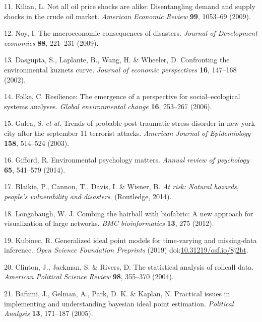 \documentclass[
]{article}
\newenvironment{cslreferences}%
  {}%
  {\par}
\begin{document}
\begin{cslreferences}
\leavevmode\hypertarget{ref-kilian2009not}{}%
11. Kilian, L. Not all oil price shocks are alike: Disentangling demand and supply shocks in the crude oil market. \emph{American Economic Review} \textbf{99}, 1053--69 (2009).

\leavevmode\hypertarget{ref-noy2009macroeconomic}{}%
12. Noy, I. The macroeconomic consequences of disasters. \emph{Journal of Development economics} \textbf{88}, 221--231 (2009).

\leavevmode\hypertarget{ref-dasgupta2002confronting}{}%
13. Dasgupta, S., Laplante, B., Wang, H. \& Wheeler, D. Confronting the environmental kuznets curve. \emph{Journal of economic perspectives} \textbf{16}, 147--168 (2002).

\leavevmode\hypertarget{ref-folke2006resilience}{}%
14. Folke, C. Resilience: The emergence of a perspective for social--ecological systems analyses. \emph{Global environmental change} \textbf{16}, 253--267 (2006).

\leavevmode\hypertarget{ref-galea2003trends}{}%
15. Galea, S. \emph{et al.} Trends of probable post-traumatic stress disorder in new york city after the september 11 terrorist attacks. \emph{American Journal of Epidemiology} \textbf{158}, 514--524 (2003).

\leavevmode\hypertarget{ref-gifford2014environmental}{}%
16. Gifford, R. Environmental psychology matters. \emph{Annual review of psychology} \textbf{65}, 541--579 (2014).

\leavevmode\hypertarget{ref-blaikie2014risk}{}%
17. Blaikie, P., Cannon, T., Davis, I. \& Wisner, B. \emph{At risk: Natural hazards, people's vulnerability and disasters}. (Routledge, 2014).

\leavevmode\hypertarget{ref-longabaugh2012}{}%
18. Longabaugh, W. J. Combing the hairball with biofabric: A new approach for visualization of large networks. \emph{BMC bioinformatics} \textbf{13}, 275 (2012).

\leavevmode\hypertarget{ref-kubinec2019ideal}{}%
19. Kubinec, R. Generalized ideal point models for time-varying and missing-data inference. \emph{Open Science Foundation Preprints} (2019) doi:\href{https://doi.org/10.31219/osf.io/8j2bt}{10.31219/osf.io/8j2bt}.

\leavevmode\hypertarget{ref-jackman2004}{}%
20. Clinton, J., Jackman, S. \& Rivers, D. The statistical analysis of rollcall data. \emph{American Political Science Review} \textbf{98}, 355--370 (2004).

\leavevmode\hypertarget{ref-gelman2005}{}%
21. Bafumi, J., Gelman, A., Park, D. K. \& Kaplan, N. Practical issues in implementing and understanding bayesian ideal point estimation. \emph{Political Analysis} \textbf{13}, 171--187 (2005).


\end{cslreferences}
\end{document}
